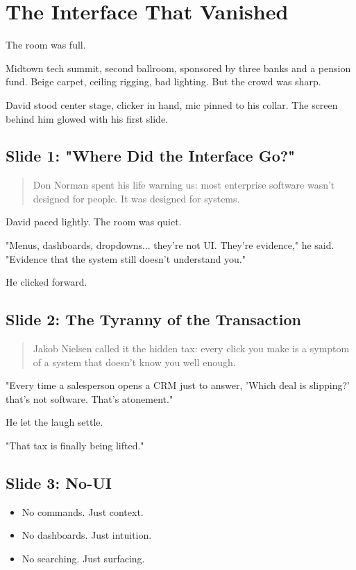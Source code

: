 \section{The Interface That Vanished}

The room was full.

Midtown tech summit, second ballroom, sponsored by three banks and a pension fund. Beige 
carpet, ceiling rigging, bad lighting. But the crowd was sharp.

David stood center stage, clicker in hand, mic pinned to his collar. The screen behind him 
glowed with his first slide.

\subsection{Slide 1: "Where Did the Interface Go?"}

\begin{quote}
Don Norman spent his life warning us: most enterprise software wasn’t designed for people. 
It was designed for systems.
\end{quote}

David paced lightly. The room was quiet.

"Menus, dashboards, dropdowns... they're not UI. They're evidence," he said. "Evidence that 
the system still doesn't understand you."

He clicked forward.

\subsection{Slide 2: The Tyranny of the Transaction}

\begin{quote}
Jakob Nielsen called it the hidden tax: every click you make is a symptom of a system that 
doesn't know you well enough.
\end{quote}

"Every time a salesperson opens a CRM just to answer, 'Which deal is slipping?' that’s not 
software. That’s atonement."

He let the laugh settle.

"That tax is finally being lifted."

\subsection{Slide 3: No-UI}

\begin{itemize}
\item No commands. Just context.
\item No dashboards. Just intuition.
\item No searching. Just surfacing.
\end{itemize}

